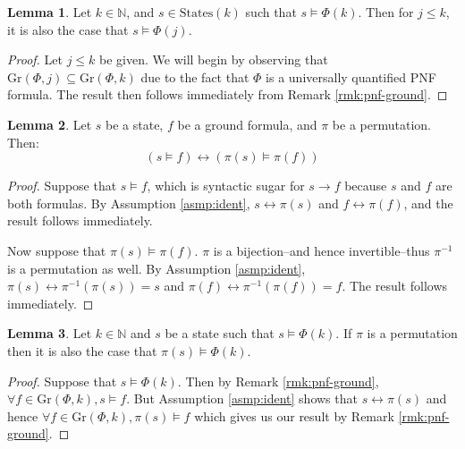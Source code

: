 \documentclass[12pt]{article}
\theoremstyle{definition}
\newtheorem{lemma}{Lemma}
\theoremstyle{remark}
\newcommand{\states}{\text{States}}
\newcommand{\gr}{\text{Gr}}
\begin{document}
\begin{lemma}
  \label{lem:lt-sat}
  Let $k \in \mathbb{N}$, and $s \in \states(k)$ such that $s \models \Phi(k)$.  Then for $j \leq k$, it is also the case that $s \models \Phi(j)$.
\end{lemma}
\begin{proof}
  Let $j \leq k$ be given.  We will begin by observing that $\gr(\Phi,j) \subseteq \gr(\Phi,k)$ due to the fact that $\Phi$ is a universally quantified PNF formula.  The result then follows immediately from Remark \ref{rmk:pnf-ground}.
\end{proof}

\begin{lemma}
  \label{lem:state-sat-perm}
  Let $s$ be a state, $f$ be a ground formula, and $\pi$ be a permutation.  Then:
  $$(s \models f) \leftrightarrow (\pi(s) \models \pi(f))$$
\end{lemma}
\begin{proof}
  Suppose that $s \models f$, which is syntactic sugar for $s \rightarrow f$ because $s$ and $f$ are both formulas.  By Assumption \ref{asmp:ident}, $s \leftrightarrow \pi(s)$ and $f \leftrightarrow \pi(f)$, and the result follows immediately.

  Now suppose that $\pi(s) \models \pi(f)$.  $\pi$ is a bijection--and hence invertible--thus $\pi^{-1}$ is a permutation as well.  By Assumption \ref{asmp:ident}, $\pi(s) \leftrightarrow \pi^{-1}(\pi(s)) = s$ and $\pi(f) \leftrightarrow \pi^{-1}(\pi(f)) = f$.  The result follows immediately.
\end{proof}

\begin{lemma}
  \label{lem:state-perm}
  Let $k \in \mathbb{N}$ and $s$ be a state such that $s \models \Phi(k)$.  If $\pi$ is a permutation then it is also the case that $\pi(s) \models \Phi(k)$.
\end{lemma}
\begin{proof}
  Suppose that $s \models \Phi(k)$.  Then by Remark \ref{rmk:pnf-ground}, $\forall f \in \gr(\Phi,k), s \models f$.  But Assumption \ref{asmp:ident} shows that $s \leftrightarrow \pi(s)$ and hence $\forall f \in \gr(\Phi,k), \pi(s) \models f$ which gives us our result by Remark \ref{rmk:pnf-ground}.
\end{proof}
\end{document}
